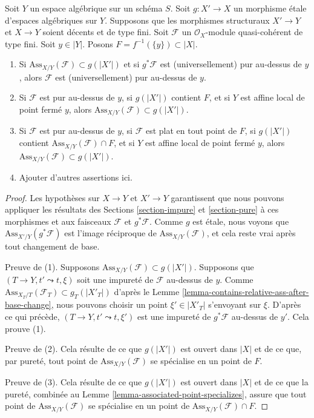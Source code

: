 \begin{lemma}
\label{lemma-pure-on-top}
Soit $Y$ un espace algébrique sur un schéma $S$. Soit $g : X' \to X$ un
morphisme \'etale d'espaces algébriques sur $Y$. Supposons que les morphismes
structuraux $X' \to Y$ et $X \to Y$ soient décents et de type fini.
Soit $\mathcal{F}$ un $\mathcal{O}_X$-module quasi-cohérent de type fini.
Soit $y \in |Y|$. Posons $F = f^{-1}(\{y\}) \subset |X|$.
\begin{enumerate}
\item Si $\text{Ass}_{X/Y}(\mathcal{F}) \subset g(|X'|)$
et si $g^*\mathcal{F}$ est (universellement) pur au-dessus de $y$, alors
$\mathcal{F}$ est (universellement) pur au-dessus de $y$.
\item Si $\mathcal{F}$ est pur au-dessus de $y$, si $g(|X'|)$ contient $F$, et si
$Y$ est affine local de point fermé $y$, alors
$\text{Ass}_{X/Y}(\mathcal{F}) \subset g(|X'|)$.
\item Si $\mathcal{F}$ est pur au-dessus de $y$, si $\mathcal{F}$ est plat
en tout point de $F$, si $g(|X'|)$ contient
$\text{Ass}_{X/Y}(\mathcal{F}) \cap F$, et si $Y$ est affine local
de point fermé $y$, alors
$\text{Ass}_{X/Y}(\mathcal{F}) \subset g(|X'|)$.
\item Ajouter d'autres assertions ici.
\end{enumerate}
\end{lemma}

\begin{proof}
Les hypothèses sur $X \to Y$ et $X' \to Y$ garantissent que
nous pouvons appliquer les résultats des Sections \ref{section-impure} et
\ref{section-pure}
à ces morphismes et aux faisceaux $\mathcal{F}$ et $g^*\mathcal{F}$.
Comme $g$ est \'etale, nous voyons que
$\text{Ass}_{X'/Y}(g^*\mathcal{F})$
est l'image réciproque de $\text{Ass}_{X/Y}(\mathcal{F})$,
et cela reste vrai après tout changement de base.

\medskip\noindent
Preuve de (1). Supposons $\text{Ass}_{X/Y}(\mathcal{F}) \subset g(|X'|)$.
Supposons que $(T \to Y, t' \leadsto t, \xi)$
soit une impureté de $\mathcal{F}$ au-dessus de $y$. Comme
$\text{Ass}_{X_T/T}(\mathcal{F}_T) \subset g_T(|X'_T|)$ d'après
le Lemme \ref{lemma-contains-relative-ass-after-base-change}, nous pouvons
choisir
un point $\xi' \in |X'_T|$ s'envoyant sur $\xi$. D'après ce qui précède,
$(T \to Y, t' \leadsto t, \xi')$ est une impureté de
$g^*\mathcal{F}$ au-dessus de $y'$. Cela prouve (1).

\medskip\noindent
Preuve de (2). Cela résulte de ce que $g(|X'|)$ est ouvert
dans $|X|$ et de ce que, par pureté, tout point de
$\text{Ass}_{X/Y}(\mathcal{F})$ se spécialise en un point de $F$.

\medskip\noindent
Preuve de (3). Cela résulte de ce que $g(|X'|)$ est ouvert
dans $|X|$ et de ce que la pureté, combinée au
Lemme \ref{lemma-associated-point-specializes}, assure que tout point de
$\text{Ass}_{X/Y}(\mathcal{F})$ se spécialise en un point de
$\text{Ass}_{X/Y}(\mathcal{F}) \cap F$.
\end{proof}

